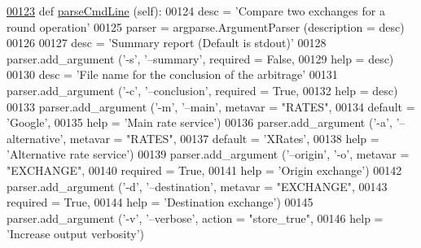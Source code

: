 \begin{DoxyCode}
\hypertarget{classe2e_1_1_application.tex_l00123}{}\hyperlink{classe2e_1_1_application_a91b8b6df6456d27bed503849ffcdcc77}{00123}     \textcolor{keyword}{def }\hyperlink{classe2e_1_1_application_a91b8b6df6456d27bed503849ffcdcc77}{parseCmdLine} (self):
00124         desc = \textcolor{stringliteral}{'Compare two exchanges for a round operation'}
00125         parser = argparse.ArgumentParser (description = desc)
00126         
00127         desc = \textcolor{stringliteral}{'Summary report (Default is stdout)'} 
00128         parser.add\_argument (\textcolor{stringliteral}{'-s'}, \textcolor{stringliteral}{'--summary'}, required = \textcolor{keyword}{False},
00129                              help = desc)
00130         desc = \textcolor{stringliteral}{'File name for the conclusion of the arbitrage'}
00131         parser.add\_argument (\textcolor{stringliteral}{'-c'}, \textcolor{stringliteral}{'--conclusion'}, required = \textcolor{keyword}{True},
00132                              help = desc)
00133         parser.add\_argument (\textcolor{stringliteral}{'-m'}, \textcolor{stringliteral}{'--main'}, metavar = \textcolor{stringliteral}{"RATES"}, 
00134                              default = \textcolor{stringliteral}{'Google'},
00135                              help = \textcolor{stringliteral}{'Main rate service'})
00136         parser.add\_argument (\textcolor{stringliteral}{'-a'}, \textcolor{stringliteral}{'--alternative'}, metavar = \textcolor{stringliteral}{"RATES"},
00137                              default = \textcolor{stringliteral}{'XRates'},
00138                              help = \textcolor{stringliteral}{'Alternative rate service'})
00139         parser.add\_argument (\textcolor{stringliteral}{'--origin'}, \textcolor{stringliteral}{'-o'}, metavar = \textcolor{stringliteral}{"EXCHANGE"},
00140                              required = \textcolor{keyword}{True},
00141                              help = \textcolor{stringliteral}{'Origin exchange'})
00142         parser.add\_argument (\textcolor{stringliteral}{'-d'}, \textcolor{stringliteral}{'--destination'}, metavar = \textcolor{stringliteral}{"EXCHANGE"},
00143                              required = \textcolor{keyword}{True},
00144                              help = \textcolor{stringliteral}{'Destination exchange'})
00145         parser.add\_argument (\textcolor{stringliteral}{'-v'}, \textcolor{stringliteral}{'--verbose'}, action = \textcolor{stringliteral}{"store\_true"},
00146                              help = \textcolor{stringliteral}{'Increase output verbosity'})

\end{DoxyCode}
